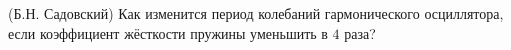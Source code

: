 (Б.Н. Садовский)
Как изменится период колебаний гармонического осциллятора, если коэффициент
жёсткости пружины уменьшить в $4$ раза?
